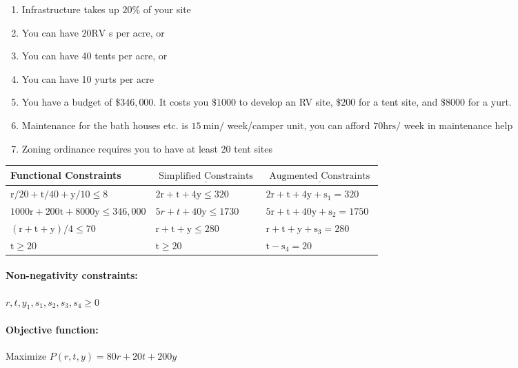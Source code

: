 \begin{enumerate}
  \item Infrastructure takes up $20 \%$ of your site

  \item You can have $20 \mathrm{RV}$ s per acre, or

  \item You can have 40 tents per acre, or

  \item You can have 10 yurts per acre

  \item You have a budget of $\$ 346,000$. It costs you $\$ 1000$ to develop an RV site, $\$ 200$ for a tent site, and $\$ 8000$ for a yurt.

  \item Maintenance for the bath houses etc. is $15 \mathrm{~min} /$ week/camper unit, you can afford $70 \mathrm{hrs} /$ week in maintenance help

  \item Zoning ordinance requires you to have at least 20 tent sites

\end{enumerate}
\begin{tabular}{|l|l|l|}
\hline
Functional Constraints & $\underline{\text { Simplified Constraints }}$ & $\underline{\text { Augmented Constraints }}$ \\
\hline
$\mathrm{r} / 20+\mathrm{t} / 40+\mathrm{y} / 10 \leq 8$ & $2 \mathrm{r}+\mathrm{t}+4 \mathrm{y} \leq 320$ & $2 \mathrm{r}+\mathrm{t}+4 \mathrm{y}+\mathrm{s}_{1}=320$ \\
$1000 \mathrm{r}+200 \mathrm{t}+8000 \mathrm{y} \leq 346,000$ & $5 r+t+40 \mathrm{y} \leq 1730$ & $5 \mathrm{r}+\mathrm{t}+40 \mathrm{y}+\mathrm{s}_{2}=1750$ \\
$(\mathrm{r}+\mathrm{t}+\mathrm{y}) / 4 \leq 70$ & $\mathrm{r}+\mathrm{t}+\mathrm{y} \leq 280$ & $\mathrm{r}+\mathrm{t}+\mathrm{y}+\mathrm{s}_{3}=280$ \\
$\mathrm{t} \geq 20$ & $\mathrm{t} \geq 20$ & $\mathrm{t}-\mathrm{s}_{4}=20$ \\
\hline
\end{tabular}

\paragraph{Non-negativity constraints:}
$r, t, y_{1}, s_{1}, s_{2}, s_{3}, s_{4} \geq 0$

\paragraph{Objective function:}
Maximize $P(r, t, y)=80 r+20 t+200 y$

